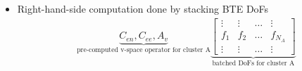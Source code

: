 \documentclass[mathserif, aspectratio=169]{beamer}
\begin{document}
\begin{frame}
\begin{center}
{}
	\end{center}
	\begin{itemize}
		\item Right-hand-side computation done by stacking BTE DoFs 
		\begin{align*}
			\underbrace{C_{en}, C_{ee}, A_{v}}_{\text{pre-computed v-space operator for cluster A}} \underbrace{\begin{bmatrix}
				\vdots & \vdots & \hdots &\vdots\\
				f_1    & f_2    & \hdots & f_{N_A} \\
				\vdots & \vdots & \hdots &\vdots
			\end{bmatrix}}_{\text{batched DoFs for cluster A}}
		\end{align*}
	\end{itemize}
\end{frame}
\end{document}

